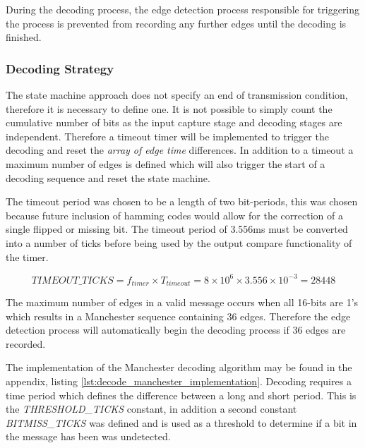 During the decoding process, the edge detection process responsible for triggering the process is prevented from recording any further edges until the decoding is finished.

\subsubsection{Decoding Strategy}

The state machine approach does not specify an end of transmission condition, therefore it is necessary to define one. It is not possible to simply count the cumulative number of bits as the input capture stage and decoding stages are independent. Therefore a timeout timer will be implemented to trigger the decoding and reset the \textit{array of edge time} differences. In addition to a timeout a maximum number of edges is defined which will also trigger the start of a decoding sequence and reset the state machine.

The timeout period was chosen to be a length of two bit-periods, this was chosen because future inclusion of hamming codes would allow for the correction of a single flipped or missing bit. The timeout period of 3.556ms must be converted into a number of ticks before being used by the output compare functionality of the timer.

\[TIMEOUT\_TICKS = f_{timer} \times T_{timeout} = 8 \times 10^6 \times 3.556 \times 10^{-3} = 28448\]

The maximum number of edges in a valid message occurs when all 16-bits are 1's which results in a Manchester sequence containing 36 edges. Therefore the edge detection process will automatically begin the decoding process if 36 edges are recorded.

The implementation of the Manchester decoding algorithm may be found in the appendix, listing \ref{lst:decode_manchester_implementation}. Decoding requires a time period which defines the difference between a long and short period. This is the \textit{THRESHOLD\_TICKS} constant, in addition a second constant \textit{BITMISS\_TICKS} was defined and is used as a threshold to determine if a bit in the message has been was undetected.









